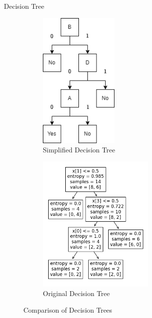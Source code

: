 \documentclass[12pt]{article}
\begin{document}
\newpage
\problem Decision Tree

\solution
\begin{figure}[!ht]
    \centering
    \begin{subfigure}{0.5\textwidth}
        \centering
        \includegraphics[height=256px]{Images/Question 7 Simplified.png}
        \caption{Simplified Decision Tree}
    \end{subfigure}%
    \begin{subfigure}{0.5\textwidth}
        \centering
        \includegraphics[height=256px]{Images/Question 7 Original.png}
        \caption{Original Decision Tree}
    \end{subfigure}
    \caption{Comparison of Decision Trees}
\end{figure}
\end{document}
